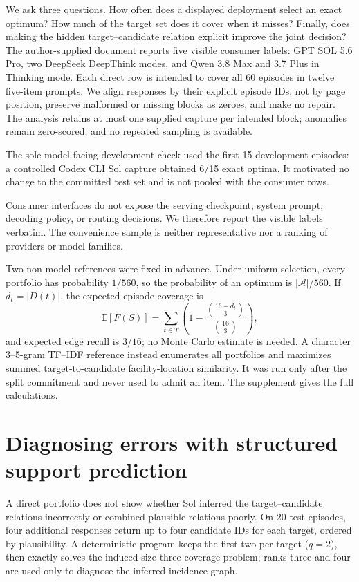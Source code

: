 We ask three questions.  How often does a displayed deployment select an exact
optimum?  How much of the target set does it cover when it misses?  Finally,
does making the hidden target--candidate relation explicit improve the joint
decision?  The author-supplied document reports five visible consumer labels:
GPT SOL 5.6 Pro, two DeepSeek DeepThink modes, and Qwen 3.8 Max and 3.7 Plus in
Thinking mode.  Each direct row is intended to cover all 60 episodes in twelve
five-item prompts.  We align responses by their explicit episode IDs, not by
page position, preserve malformed or missing blocks as zeroes, and make no
repair.  The analysis retains at most one supplied capture per intended block; anomalies
remain zero-scored, and no repeated sampling is available.

The sole model-facing development check used the first 15 development episodes:
a controlled Codex CLI Sol capture obtained 6/15 exact optima.  It motivated no
change to the committed test set and is not pooled with the consumer rows.

Consumer interfaces do not expose the serving checkpoint, system prompt,
decoding policy, or routing decisions.  We therefore report the visible labels
verbatim.  The convenience sample is neither representative nor a ranking of
providers or model families.

Two non-model references were fixed in advance.  Under uniform selection,
every portfolio has probability $1/560$, so the probability of an optimum is
$|\mathcal A|/560$.  If $d_t=|D(t)|$, the expected episode coverage is
\[
 \mathbb E[F(S)]=\sum_{t\in T}\left(1-
 \frac{\binom{16-d_t}{3}}{\binom{16}{3}}\right),
\]
and expected edge recall is $3/16$; no Monte Carlo estimate is needed.  A
character 3--5-gram TF--IDF reference instead enumerates all portfolios and
maximizes summed target-to-candidate facility-location similarity.  It was run
only after the split commitment and never used to admit an item.  The
supplement gives the full calculations.



\section{Diagnosing errors with structured support prediction}

A direct portfolio does not show whether Sol inferred the target--candidate
relations incorrectly or combined plausible relations poorly.  On 20 test
episodes, four additional responses return up to four candidate IDs for each
target, ordered by plausibility.  A deterministic program keeps the first two
per target ($q=2$), then exactly solves the induced size-three coverage problem;
ranks three and four are used only to diagnose the inferred incidence graph.

